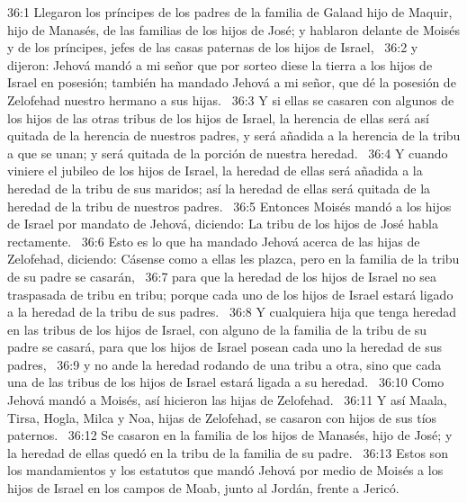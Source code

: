 36:1 Llegaron los príncipes de los padres de la familia de Galaad hijo de Maquir, hijo de Manasés, de las familias de los hijos de José; y hablaron delante de Moisés y de los príncipes, jefes de las casas paternas de los hijos de Israel,  
36:2 y dijeron: Jehová mandó a mi señor que por sorteo diese la tierra a los hijos de Israel en posesión; también ha mandado Jehová a mi señor, que dé la posesión de Zelofehad nuestro hermano a sus hijas.  
36:3 Y si ellas se casaren con algunos de los hijos de las otras tribus de los hijos de Israel, la herencia de ellas será así quitada de la herencia de nuestros padres, y será añadida a la herencia de la tribu a que se unan; y será quitada de la porción de nuestra heredad.  
36:4 Y cuando viniere el jubileo de los hijos de Israel, la heredad de ellas será añadida a la heredad de la tribu de sus maridos; así la heredad de ellas será quitada de la heredad de la tribu de nuestros padres.  
36:5 Entonces Moisés mandó a los hijos de Israel por mandato de Jehová, diciendo: La tribu de los hijos de José habla rectamente.  
36:6 Esto es lo que ha mandado Jehová acerca de las hijas de Zelofehad, diciendo: Cásense como a ellas les plazca, pero en la familia de la tribu de su padre se casarán,  
36:7 para que la heredad de los hijos de Israel no sea traspasada de tribu en tribu; porque cada uno de los hijos de Israel estará ligado a la heredad de la tribu de sus padres.  
36:8 Y cualquiera hija que tenga heredad en las tribus de los hijos de Israel, con alguno de la familia de la tribu de su padre se casará, para que los hijos de Israel posean cada uno la heredad de sus padres,  
36:9 y no ande la heredad rodando de una tribu a otra, sino que cada una de las tribus de los hijos de Israel estará ligada a su heredad.  
36:10 Como Jehová mandó a Moisés, así hicieron las hijas de Zelofehad.  
36:11 Y así Maala, Tirsa, Hogla, Milca y Noa, hijas de Zelofehad, se casaron con hijos de sus tíos paternos.  
36:12 Se casaron en la familia de los hijos de Manasés, hijo de José; y la heredad de ellas quedó en la tribu de la familia de su padre.  
36:13 Estos son los mandamientos y los estatutos que mandó Jehová por medio de Moisés a los hijos de Israel en los campos de Moab, junto al Jordán, frente a Jericó.
